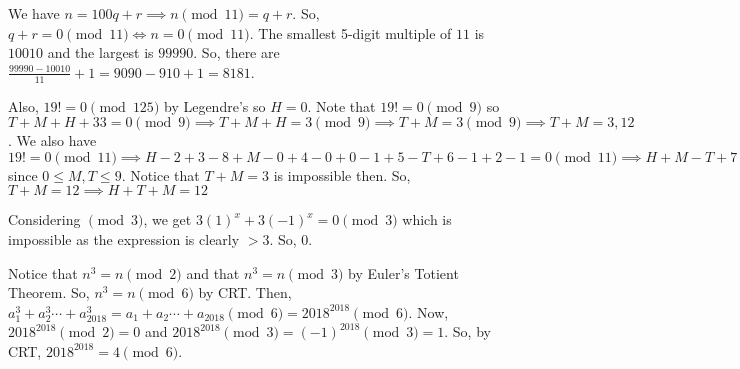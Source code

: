 \documentclass[11pt]{article}
\begin{document}
\begin{sol}
We have $n=100q+r\implies n\pmod{11}=q+r$. So, $q+r=0\pmod{11}\iff n=0\pmod{11}$. The smallest 5-digit multiple of $11$ is $10010$ and the largest is $99990$. So, there are $\frac{99990-10010}{11}+1=9090-910+1=\boxed{8181}$.
\end{sol}


\begin{sol}
Also, $19!=0\pmod{125}$ by Legendre's so $H=0$. Note that $19!=0\pmod{9}$ so $T+M+H+33=0\pmod{9}\implies T+M+H=3\pmod{9}\implies T+M=3\pmod{9}\implies T+M=3,12$.  We also have $19!=0\pmod{11}\implies H-2+3-8+M-0+4-0+0-1+5-T+6-1+2-1=0\pmod{11}\implies H+M-T+7=0\pmod{11}\implies H+M-T=4\pmod{11}\implies M-T=4\pmod{11}\implies M-T=4$ since $0\leq M,T\leq 9$. Notice that $T+M=3$ is impossible then. So, $T+M=12\implies H+T+M=\boxed{12}$
\end{sol}


\begin{sol}
Considering $\pmod{3}$, we get $3(1)^x+3(-1)^x=0\pmod{3}$ which is impossible as the expression is clearly $>3$. So, $\boxed{0}$.
\end{sol}


\begin{sol}
Notice that $n^3=n\pmod{2}$ and that $n^3=n\pmod{3}$ by Euler's Totient Theorem. So, $n^3=n\pmod{6}$ by CRT. Then, $a_1^3+a_2^3\cdots + a_{2018}^3=a_{1}+a_{2}\cdots +a_{2018}\pmod{6}=2018^{2018}\pmod{6}$. Now, $2018^{2018}\pmod{2}=0$ and $2018^{2018}\pmod{3}=(-1)^{2018}\pmod{3}=1$. So, by CRT, $2018^{2018}=\boxed{4}\pmod{6}$.
\end{sol}
 
\end{document}
